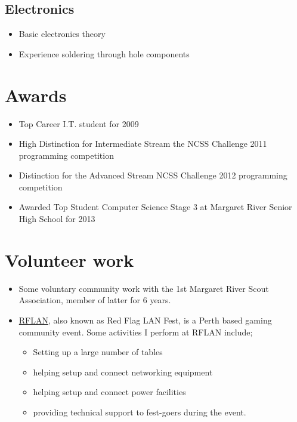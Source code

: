 \documentclass{article}
\begin{document}
  \subsection{Electronics}
    \begin{itemize}
      \item Basic electronics theory
      \item Experience soldering through hole components
    \end{itemize}

\section{Awards}
  \begin{itemize}
    \item Top Career I.T. student for 2009
    \item High Distinction for Intermediate Stream the NCSS Challenge 2011 programming competition
    \item Distinction for the Advanced Stream NCSS Challenge 2012 programming competition
    \item Awarded Top Student Computer Science Stage 3 at Margaret River Senior High School for 2013
  \end{itemize}

\section{Volunteer work}
  \begin{itemize}
    \item Some voluntary community work with the 1st Margaret River Scout Association, member of latter for 6 years.
    \item{
        \href{http://www.rflan.org/contact/volunteer.html}{RFLAN}, also known as Red Flag LAN Fest, is a Perth based gaming community event.
        Some activities I perform at RFLAN include;
        \begin{itemize}
          \item Setting up a large number of tables
          \item helping setup and connect networking equipment
          \item helping setup and connect power facilities
          \item providing technical support to fest-goers during the event.
        \end{itemize}
    }
  \end{itemize}
\end{document}
